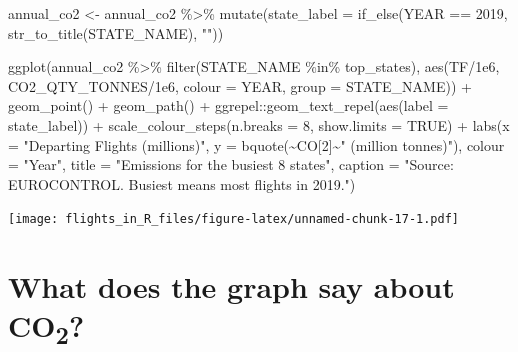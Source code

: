 \documentclass[
]{book}
\newenvironment{Shaded}{\begin{snugshade}}{\end{snugshade}}
\newcommand{\AttributeTok}[1]{\textcolor[rgb]{0.77,0.63,0.00}{#1}}
\newcommand{\ConstantTok}[1]{\textcolor[rgb]{0.00,0.00,0.00}{#1}}
\newcommand{\DecValTok}[1]{\textcolor[rgb]{0.00,0.00,0.81}{#1}}
\newcommand{\FloatTok}[1]{\textcolor[rgb]{0.00,0.00,0.81}{#1}}
\newcommand{\FunctionTok}[1]{\textcolor[rgb]{0.00,0.00,0.00}{#1}}
\newcommand{\NormalTok}[1]{#1}
\newcommand{\OtherTok}[1]{\textcolor[rgb]{0.56,0.35,0.01}{#1}}
\newcommand{\SpecialCharTok}[1]{\textcolor[rgb]{0.00,0.00,0.00}{#1}}
\newcommand{\StringTok}[1]{\textcolor[rgb]{0.31,0.60,0.02}{#1}}
\begin{document}
\begin{Shaded}
\begin{Highlighting}[]
\NormalTok{annual\_co2 }\OtherTok{\textless{}{-}}\NormalTok{ annual\_co2 }\SpecialCharTok{\%\textgreater{}\%} 
  \FunctionTok{mutate}\NormalTok{(}\AttributeTok{state\_label =} \FunctionTok{if\_else}\NormalTok{(YEAR }\SpecialCharTok{==} \DecValTok{2019}\NormalTok{, }\FunctionTok{str\_to\_title}\NormalTok{(STATE\_NAME), }\StringTok{""}\NormalTok{))}

\FunctionTok{ggplot}\NormalTok{(annual\_co2 }\SpecialCharTok{\%\textgreater{}\%} 
         \FunctionTok{filter}\NormalTok{(STATE\_NAME }\SpecialCharTok{\%in\%}\NormalTok{ top\_states), }
       \FunctionTok{aes}\NormalTok{(TF}\SpecialCharTok{/}\FloatTok{1e6}\NormalTok{, CO2\_QTY\_TONNES}\SpecialCharTok{/}\FloatTok{1e6}\NormalTok{, }
           \AttributeTok{colour =}\NormalTok{ YEAR, }\AttributeTok{group =}\NormalTok{ STATE\_NAME)) }\SpecialCharTok{+}
  \FunctionTok{geom\_point}\NormalTok{() }\SpecialCharTok{+} 
  \FunctionTok{geom\_path}\NormalTok{() }\SpecialCharTok{+}
\NormalTok{  ggrepel}\SpecialCharTok{::}\FunctionTok{geom\_text\_repel}\NormalTok{(}\FunctionTok{aes}\NormalTok{(}\AttributeTok{label =}\NormalTok{ state\_label)) }\SpecialCharTok{+}
  \FunctionTok{scale\_colour\_steps}\NormalTok{(}\AttributeTok{n.breaks =} \DecValTok{8}\NormalTok{, }\AttributeTok{show.limits =} \ConstantTok{TRUE}\NormalTok{) }\SpecialCharTok{+}
  \FunctionTok{labs}\NormalTok{(}\AttributeTok{x =} \StringTok{"Departing Flights (millions)"}\NormalTok{, }
       \AttributeTok{y =} \FunctionTok{bquote}\NormalTok{(}\SpecialCharTok{\textasciitilde{}}\NormalTok{CO[}\DecValTok{2}\NormalTok{]}\SpecialCharTok{\textasciitilde{}}\StringTok{" (million tonnes)"}\NormalTok{),}
       \AttributeTok{colour =} \StringTok{"Year"}\NormalTok{,}
       \AttributeTok{title =} \StringTok{"Emissions for the busiest 8 states"}\NormalTok{,}
       \AttributeTok{caption =} \StringTok{"Source: EUROCONTROL. \textquotesingle{}Busiest\textquotesingle{} means most flights in 2019."}\NormalTok{)}
\end{Highlighting}
\end{Shaded}

\texttt{[image: flights\_in\_R\_files/figure-latex/unnamed-chunk-17-1.pdf]}

\hypertarget{what-does-the-graph-say-about-co2}{%
\section{\texorpdfstring{What does the graph say about CO\textsubscript{2}?}{What does the graph say about CO2?}}\label{what-does-the-graph-say-about-co2}}
\end{document}
